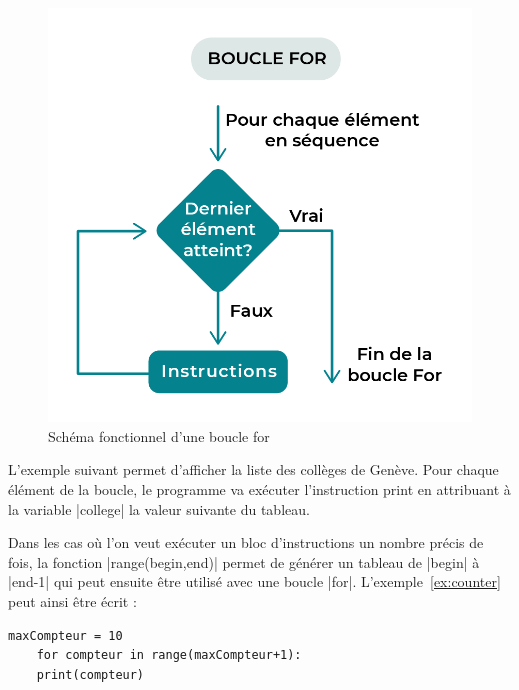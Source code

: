 \begin{figure}[h]\begin{center}
		\includegraphics[scale=.3]{Images/boucles/for-loop}
		\caption{Schéma fonctionnel d'une boucle for}
\end{center}\end{figure}

\begin{myexample}
	L'exemple suivant permet d'afficher la liste des collèges de Genève. Pour chaque élément de la boucle, le programme va exécuter l'instruction print en attribuant à la variable |college| la valeur suivante du tableau.
\end{myexample}
%
%	

\begin{myremarque}
	Dans les cas où l'on veut exécuter un bloc d'instructions un nombre précis de fois, la fonction |range(begin,end)| permet de générer un tableau de |begin| à |end-1| qui peut ensuite être utilisé avec une boucle |for|. L'exemple~\ref{ex:counter} peut ainsi être écrit : 
	
\end{myremarque}

\begin{lstlisting}[numbers=none]
	maxCompteur = 10
	for compteur in range(maxCompteur+1):
	print(compteur)
\end{lstlisting}

%
%
%
